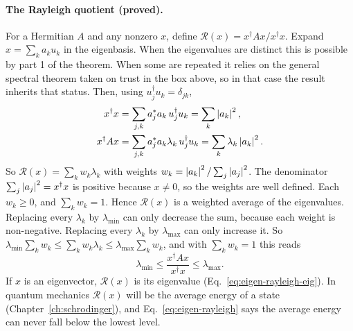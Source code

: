 \paragraph{The Rayleigh quotient (proved).} For a Hermitian $A$ and any nonzero $x$, define $\mathcal{R}(x)=x^\dagger Ax/x^\dagger x$. Expand $x=\sum_ka_ku_k$ in the eigenbasis. When the eigenvalues are distinct this is possible by part 1 of the theorem. When some are repeated it relies on the general spectral theorem taken on trust in the box above, so in that case the result inherits that status. Then, using $u_j^\dagger u_k=\delta_{jk}$,
\begin{align}
x^\dagger x&=\sum_{j,k}a_j^*a_k\,u_j^\dagger u_k=\sum_k\left\lvert a_k\right\rvert^2,\\
x^\dagger Ax&=\sum_{j,k}a_j^*a_k\lambda_k\,u_j^\dagger u_k=\sum_k\lambda_k\left\lvert a_k\right\rvert^2.
\end{align}
So $\mathcal{R}(x)=\sum_k w_k\lambda_k$ with weights $w_k=\left\lvert a_k\right\rvert^2/\sum_j\left\lvert a_j\right\rvert^2$. The denominator $\sum_j\left\lvert a_j\right\rvert^2=x^\dagger x$ is positive because $x\ne0$, so the weights are well defined. Each $w_k\ge0$, and $\sum_kw_k=1$. Hence $\mathcal{R}(x)$ is a weighted average of the eigenvalues. Replacing every $\lambda_k$ by $\lambda_{\min}$ can only decrease the sum, because each weight is non-negative. Replacing every $\lambda_k$ by $\lambda_{\max}$ can only increase it. So $\lambda_{\min}\sum_kw_k\le\sum_kw_k\lambda_k\le\lambda_{\max}\sum_kw_k$, and with $\sum_kw_k=1$ this reads
\begin{equation}
\lambda_{\min}\le\frac{x^\dagger Ax}{x^\dagger x}\le\lambda_{\max}.
\label{eq:eigen-rayleigh}
\end{equation}
If $x$ is an eigenvector, $\mathcal{R}(x)$ is its eigenvalue (Eq.~\eqref{eq:eigen-rayleigh-eig}). In quantum mechanics $\mathcal{R}(x)$ will be the average energy of a state (Chapter~\ref{ch:schrodinger}), and Eq.~\eqref{eq:eigen-rayleigh} says the average energy can never fall below the lowest level.

